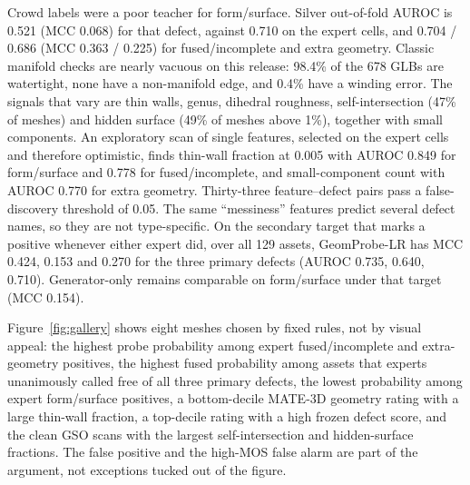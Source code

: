 Crowd labels were a poor teacher for form/surface.
Silver out-of-fold AUROC is 0.521 (MCC 0.068) for that defect, against 0.710 on the expert cells, and 0.704 / 0.686 (MCC 0.363 / 0.225) for fused/incomplete and extra geometry.
Classic manifold checks are nearly vacuous on this release: 98.4\% of the 678 GLBs are watertight, none have a non-manifold edge, and 0.4\% have a winding error.
The signals that vary are thin walls, genus, dihedral roughness, self-intersection (47\% of meshes) and hidden surface (49\% of meshes above 1\%), together with small components.
An exploratory scan of single features, selected on the expert cells and therefore optimistic, finds thin-wall fraction at 0.005 with AUROC 0.849 for form/surface and 0.778 for fused/incomplete, and small-component count with AUROC 0.770 for extra geometry.
Thirty-three feature--defect pairs pass a false-discovery threshold of 0.05.
The same ``messiness'' features predict several defect names, so they are not type-specific.
On the secondary target that marks a positive whenever either expert did, over all 129 assets, GeomProbe-LR has MCC 0.424, 0.153 and 0.270 for the three primary defects (AUROC 0.735, 0.640, 0.710).
Generator-only remains comparable on form/surface under that target (MCC 0.154).

Figure~\ref{fig:gallery} shows eight meshes chosen by fixed rules, not by visual appeal: the highest probe probability among expert fused/incomplete and extra-geometry positives, the highest fused probability among assets that experts unanimously called free of all three primary defects, the lowest probability among expert form/surface positives, a bottom-decile MATE-3D geometry rating with a large thin-wall fraction, a top-decile rating with a high frozen defect score, and the clean GSO scans with the largest self-intersection and hidden-surface fractions.
The false positive and the high-MOS false alarm are part of the argument, not exceptions tucked out of the figure.

